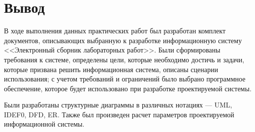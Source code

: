 \documentclass[a4paper,14pt]{extarticle}
\begin{document}
\section{Вывод}

В ходе выполнения данных практических работ был разработан комплект документов, описывающих выбранную к разработке информационную систему <<Электронный сборник лабораторных работ>>. Были сформированы требования к системе, определены цели, которые необходимо достичь и задачи, которые призвана решить информационная система, описаны сценарии использования; с учетом требований и ограничений было выбрано программное обеспечение, которое будет использовано при разработке проектируемой системы.

Были разработаны структурные диаграммы в различных нотациях --- UML, IDEF0, DFD, ER. Также был произведен расчет параметров проектируемой информационной системы. 
\end{document}
